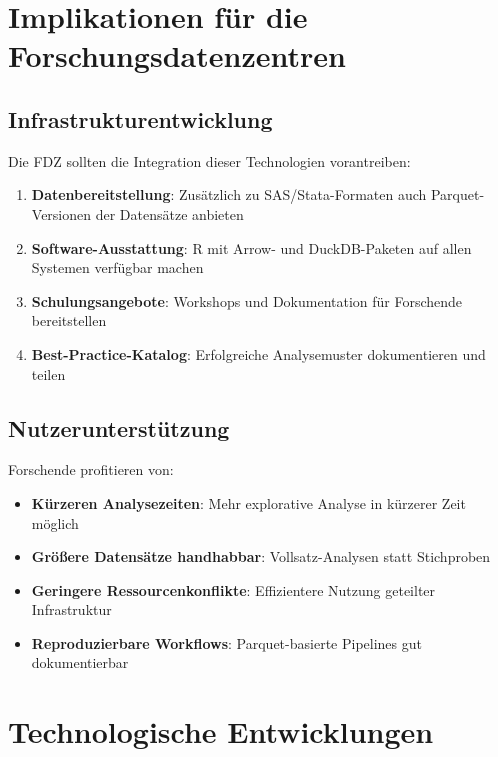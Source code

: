 \documentclass[
  ngerman,
  10pt,
  letterpaper,
  twocolumn]{book}
\providecommand{\tightlist}{%
  \setlength{\itemsep}{0pt}\setlength{\parskip}{0pt}}
\begin{document}
\section{Implikationen für die
Forschungsdatenzentren}\label{implikationen-fuxfcr-die-forschungsdatenzentren}

\subsection{Infrastrukturentwicklung}\label{infrastrukturentwicklung}

Die FDZ sollten die Integration dieser Technologien vorantreiben:

\begin{enumerate}
\def\labelenumi{\arabic{enumi}.}
\tightlist
\item
  \textbf{Datenbereitstellung}: Zusätzlich zu SAS/Stata-Formaten auch
  Parquet-Versionen der Datensätze anbieten
\item
  \textbf{Software-Ausstattung}: R mit Arrow- und DuckDB-Paketen auf
  allen Systemen verfügbar machen
\item
  \textbf{Schulungsangebote}: Workshops und Dokumentation für Forschende
  bereitstellen
\item
  \textbf{Best-Practice-Katalog}: Erfolgreiche Analysemuster
  dokumentieren und teilen
\end{enumerate}

\subsection{Nutzerunterstützung}\label{nutzerunterstuxfctzung}

Forschende profitieren von:

\begin{itemize}
\tightlist
\item
  \textbf{Kürzeren Analysezeiten}: Mehr explorative Analyse in kürzerer
  Zeit möglich
\item
  \textbf{Größere Datensätze handhabbar}: Vollsatz-Analysen statt
  Stichproben
\item
  \textbf{Geringere Ressourcenkonflikte}: Effizientere Nutzung geteilter
  Infrastruktur
\item
  \textbf{Reproduzierbare Workflows}: Parquet-basierte Pipelines gut
  dokumentierbar
\end{itemize}

\section{Technologische
Entwicklungen}\label{technologische-entwicklungen}
\end{document}
